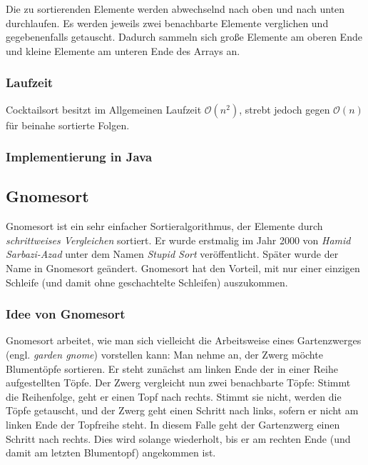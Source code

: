 \documentclass[german]{pfBook}
\newcommand{\OO}{\mathcal{O}}
\begin{document}
	Die zu sortierenden Elemente werden abwechselnd nach oben und nach unten durchlaufen. Es werden jeweils zwei benachbarte Elemente verglichen und gegebenenfalls getauscht. Dadurch sammeln sich große Elemente am oberen Ende und kleine Elemente am unteren Ende des Arrays an.
	
	\subsubsection{Laufzeit}
	
	Cocktailsort besitzt im Allgemeinen Laufzeit $\OO(n^2)$, strebt jedoch gegen $\OO(n)$ für beinahe sortierte Folgen.
	
	\subsubsection{Implementierung in Java}
	
	
	
	\subsection{Gnomesort}
	
	Gnomesort ist ein sehr einfacher Sortieralgorithmus, der Elemente durch \emph{schrittweises Vergleichen} sortiert. Er wurde erstmalig im Jahr 2000 von \emph{Hamid Sarbazi-Azad} unter dem Namen \emph{Stupid Sort} veröffentlicht. Später wurde der Name in Gnomesort geändert. Gnomesort hat den Vorteil, mit nur einer einzigen Schleife (und damit ohne geschachtelte Schleifen) auszukommen.
	
	\subsubsection{Idee von Gnomesort}
	
	Gnomesort arbeitet, wie man sich vielleicht die Arbeitsweise eines Gartenzwerges (engl. \emph{garden gnome}) vorstellen kann: Man nehme an, der Zwerg möchte Blumentöpfe sortieren. Er steht zunächst am linken Ende der in einer Reihe aufgestellten Töpfe. Der Zwerg vergleicht nun zwei benachbarte Töpfe: Stimmt die Reihenfolge, geht er einen Topf nach rechts. Stimmt sie nicht, werden die Töpfe getauscht, und der Zwerg geht einen Schritt nach links, sofern er nicht am linken Ende der Topfreihe steht. In diesem Falle geht der Gartenzwerg einen Schritt nach rechts. Dies wird solange wiederholt, bis er am rechten Ende (und damit am letzten Blumentopf) angekommen ist.
	
\end{document}

